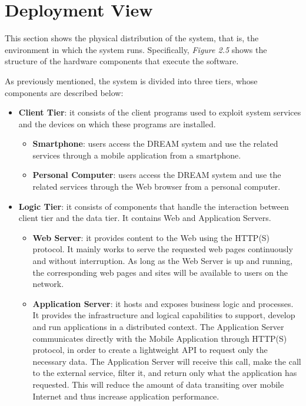 \section{Deployment View}
This section shows the physical distribution of the system, that is, the environment in which the system runs. Specifically, \textit{Figure 2.5} shows the structure of the hardware components that execute the software.

As previously mentioned, the system is divided into three tiers, whose components are described below:
\begin{itemize}
    \item \textbf{Client Tier}: it consists of the client programs used to exploit system services and the devices on which these programs are installed.
    \begin{itemize}
        \item \textbf{Smartphone}: users access the DREAM system and use the related services through a mobile application from a smartphone.
        \item \textbf{Personal Computer}: users access the DREAM system and use the related services through the Web browser from a personal computer.
    \end{itemize}
    \item \textbf{Logic Tier}: it consists of components that handle the interaction between client tier and the data tier.  It contains Web and Application Servers.
    \begin{itemize}
        \item \textbf{Web Server}: it provides content to the Web using the HTTP(S) protocol. It mainly works to serve the requested web pages continuously and without interruption. As long as the Web Server is up and running, the corresponding web pages and sites will be available to users on the network.
        \item \textbf{Application Server}: it hosts and exposes business logic and processes. It provides the infrastructure and logical capabilities to support, develop and run applications in a distributed context. The Application Server communicates directly with the Mobile Application through HTTP(S) protocol, in order to create a lightweight API to request only the necessary data. The Application Server will receive this call, make the call to the external service, filter it, and return only what the application has requested.  This will reduce the amount of data transiting over mobile Internet and thus increase application performance.
    \end{itemize}

\end{itemize}
